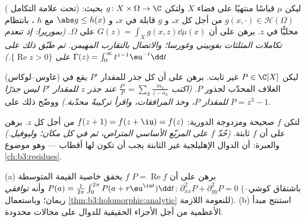 \begin{exercise}[$\star\star$]\label{exo:b3:holomorphic:7}
( تحت علامة التكامل) ليكن $\mu$ قياسًا منتهيًا على
فضاء $X$ ولتكن $g \colon X\times\Omega \to \C$ بحيث: $g(x, \cdot) \in \mathcal H(\Omega)$ من أجل كل $x$، و $g$
قابلة  في $x$، و $\abs g \leq h(x)$ مع $h$ ، بانتظام
محليًّا في $z$. برهن على أن $G(z) = \int_Xg(x, z)\dd\mu(x)$  على $\Omega$.
\emph{(بموريرا: إذ تنعدم تكاملات المثلثات بفوبيني وغورسا؛
والاتصال بالتقارب المهيمن. ثم طبّق ذلك على $\Gamma(z) =
\int_0^\infty t^{z-1}\eu^{-t}\dd t$ على
$\{\operatorname{Re}z >
0\}$.)}
\end{exercise}

\begin{exercise}[$\star\star\star$]\label{exo:b3:holomorphic:8}
(غاوس--لوكاس) ليكن $P \in \C[X]$ غير ثابت. برهن على أن كل جذر
للمقدار $P'$ يقع في الغلاف المحدّب لجذور $P$. \emph{(اكتب
$\frac{P'}{P} = \sum_k\frac{m_k}{z - a_k}$ عند جذر $z$ للمقدار $P'$ ليس جذرًا للمقدار $P$، وخذ
المرافقات، واقرأ تركيبةً محدّبة.)} ووضّح ذلك على $P = z^3 - 1$.
\end{exercise}

\begin{exercise}[$\star\star\star$]\label{exo:b3:holomorphic:9}
لتكن $f$ صحيحة ومزدوجة الدورية: $f(z + 1) = f(z + \iu)
= f(z)$ من أجل كل $z$. برهن على
أن $f$ ثابتة. \emph{(حُدّ $f$ على المربّع الأساسي المتراص، ثم
في كل مكان؛ وليوفيل.)} والعبرة: أن الدوال الإهليلجية غير
الثابتة يجب أن تكون لها أقطاب --- وهو موضوع \cref{ch:b3:residues}.
\end{exercise}

\begin{exercise}[$\star\star$]\label{exo:b3:holomorphic:10}
(a) برهن على أن $P = \operatorname{Re}f$  $f$ يحقق خاصية القيمة
المتوسطة $P(a) =
\frac1{2\pi}\int_0^{2\pi}P(a + r\eu^{\iu t})\dd t$ وأنه \emph{توافقي}: $\partial^2_{xx}P + \partial^2_{yy}P = 0$ (باشتقاق
كوشي--ريمان؛ وباستعمال \cref{thm:b3:holomorphic:analytic} للنعومة اللازمة).
(b) استنتج مبدأ الأعظمية من أجل الأجزاء الحقيقية للدوال
 على مجالات محدودة.
\end{exercise}

